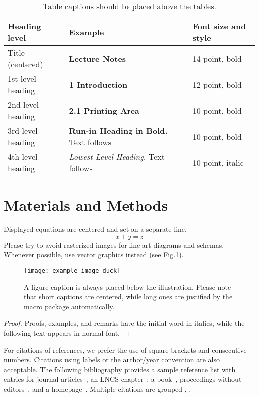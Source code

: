 \documentclass[runningheads]{llncs}
\begin{document}

\begin{table}[t]
\caption{Table captions should be placed above the
tables.}\label{tab1}
\begin{tabular}{lll}
\toprule
Heading level &  Example & Font size and style\\
\midrule
Title (centered) &  {\Large\bfseries Lecture Notes} & 14 point, bold\\
1st-level heading &  {\large\bfseries 1 Introduction} & 12 point, bold\\
2nd-level heading & {\bfseries 2.1 Printing Area} & 10 point, bold\\
3rd-level heading & {\bfseries Run-in Heading in Bold.} Text follows & 10 point, bold\\
4th-level heading & {\itshape Lowest Level Heading.} Text follows & 10 point, italic\\
\bottomrule
\end{tabular}
\end{table}

\section{Materials and Methods}

Displayed equations are centered and set on a separate
line.
\begin{equation}
x + y = z
\end{equation}
Please try to avoid rasterized images for line-art diagrams and
schemas. Whenever possible, use vector graphics instead (see
Fig.\@ \ref{fig1}).

\begin{figure}[t]
\texttt{[image: example-image-duck]}
\caption{A figure caption is always placed below the illustration.
Please note that short captions are centered, while long ones are
justified by the macro package automatically.} \label{fig1}
\end{figure}

%
%
\begin{proof}
Proofs, examples, and remarks have the initial word in italics,
while the following text appears in normal font.
\end{proof}
For citations of references, we prefer the use of square brackets
and consecutive numbers. Citations using labels or the author/year
convention are also acceptable. The following bibliography provides
a sample reference list with entries for journal
articles~\cite{ref_article1}, an LNCS chapter~\cite{ref_lncs1}, a
book~\cite{ref_book1}, proceedings without editors~\cite{ref_proc1},
and a homepage~\cite{ref_url1}. Multiple citations are grouped
\cite{ref_article1,ref_lncs1,ref_book1},
\cite{ref_article1,ref_book1,ref_proc1,ref_url1}.
\end{document}

